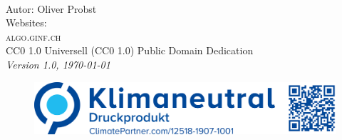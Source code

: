 
\newpage
~\vfill
\thispagestyle{empty}

\noindent Autor: Oliver Probst\\

\noindent Websites:\\
\noindent \textsc{algo.ginf.ch}\\

\noindent \ccLogo \hspace{0.1cm} \ccZero \hspace{0.1cm} CC0 1.0 Universell (CC0 1.0) Public Domain Dedication \\

\noindent \textit{Version 1.0, \today}

\begin{figure}[htb]
\includegraphics[scale=0.15]{climate}
\end{figure}
